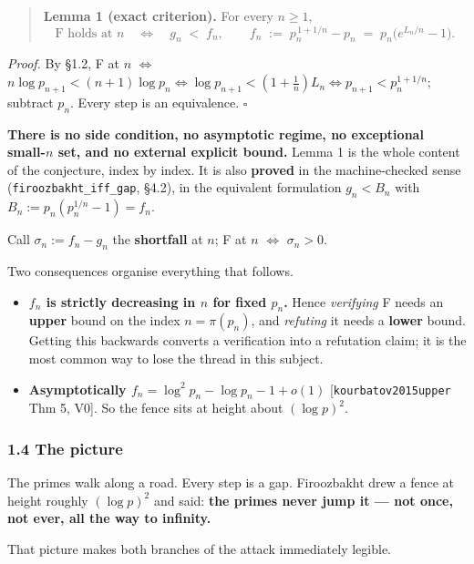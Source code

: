 \documentclass[
  a4paper,
  11pt]{article}
\providecommand{\tightlist}{%
  \setlength{\itemsep}{0pt}\setlength{\parskip}{0pt}}
\begin{document}
\begin{quote}
\textbf{Lemma 1 (exact criterion).} For every \(n \ge 1\),
\[\mathrm{F}\text{ holds at } n \quad\Longleftrightarrow\quad g_n \;<\; f_n,
\qquad f_n \;:=\; p_n^{\,1+1/n} - p_n \;=\; p_n\big(e^{L_n/n} - 1\big).\]
\end{quote}

\emph{Proof.} By §1.2, F at \(n\) \(\iff\)
\(n \log p_{n+1} < (n+1)\log p_n \iff \log p_{n+1} <
(1+\tfrac1n)L_n \iff p_{n+1} < p_n^{1+1/n}\); subtract \(p_n\). Every
step is an equivalence. \(\square\)

\textbf{There is no side condition, no asymptotic regime, no exceptional
small-\(n\) set, and no external explicit bound.} Lemma 1 is the whole
content of the conjecture, index by index. It is also \textbf{proved} in
the machine-checked sense (\texttt{firoozbakht\_iff\_gap}, §4.2), in the
equivalent formulation \(g_n < B_n\) with
\(B_n := p_n(p_n^{1/n}-1) = f_n\).

Call \(\sigma_n := f_n - g_n\) the \textbf{shortfall} at \(n\); F at
\(n\) \(\iff\) \(\sigma_n > 0\).

Two consequences organise everything that follows.

\begin{itemize}
\tightlist
\item
  \textbf{\(f_n\) is strictly decreasing in \(n\) for fixed \(p_n\).}
  Hence \emph{verifying} F needs an \textbf{upper} bound on the index
  \(n = \pi(p_n)\), and \emph{refuting} it needs a \textbf{lower} bound.
  Getting this backwards converts a verification into a refutation
  claim; it is the most common way to lose the thread in this subject.
\item
  \textbf{Asymptotically \(f_n = \log^2 p_n - \log p_n - 1 + o(1)\)}
  {[}\texttt{kourbatov2015upper} Thm 5, V0{]}. So the fence sits at
  height about \((\log p)^2\).
\end{itemize}

\subsubsection{1.4 The picture}\label{14-the-picture}

The primes walk along a road. Every step is a gap. Firoozbakht drew a
fence at height roughly \((\log p)^2\) and said: \textbf{the primes
never jump it --- not once, not ever, all the way to infinity.}

That picture makes both branches of the attack immediately legible.
\end{document}
